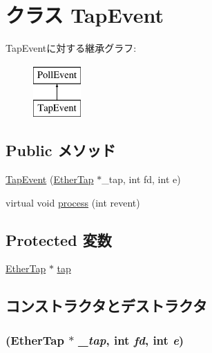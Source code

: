 \hypertarget{classTapEvent}{
\section{クラス TapEvent}
\label{classTapEvent}
}
TapEventに対する継承グラフ:\begin{figure}[H]
\begin{center}
\leavevmode
\includegraphics[height=2cm]{classTapEvent}
\end{center}
\end{figure}
\subsection*{Public メソッド}
\begin{DoxyCompactItemize}
\item 
\hyperlink{classTapEvent_ab3155da2ff77a55c495973dca67efa7b}{TapEvent} (\hyperlink{classEtherTap}{EtherTap} $\ast$\_\-tap, int fd, int e)
\item 
virtual void \hyperlink{classTapEvent_a2b093972df00400e2325baed216afc46}{process} (int revent)
\end{DoxyCompactItemize}
\subsection*{Protected 変数}
\begin{DoxyCompactItemize}
\item 
\hyperlink{classEtherTap}{EtherTap} $\ast$ \hyperlink{classTapEvent_afceac4e4f9153ef0f38b7c423422dd2e}{tap}
\end{DoxyCompactItemize}


\subsection{コンストラクタとデストラクタ}
\hypertarget{classTapEvent_ab3155da2ff77a55c495973dca67efa7b}{
\subsubsection[{TapEvent}]{ ({\bf EtherTap} $\ast$ {\em \_\-tap}, \/  int {\em fd}, \/  int {\em e})}}
\label{classTapEvent_ab3155da2ff77a55c495973dca67efa7b}




